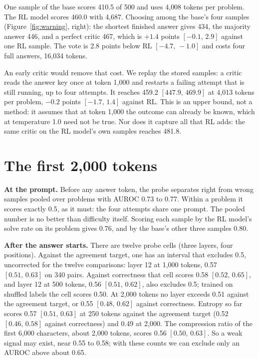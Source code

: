 \documentclass[10pt]{article}
\newcommand{\ci}[2]{$[#1,\,#2]$}
\begin{document}
One sample of the base scores 410.5 of 500 and uses 4{,}008 tokens per problem. The RL model scores 460.0 with
4{,}687. Choosing among the base's four samples (Figure~\ref{fig:warning}, right): the shortest finished answer
gives 434, the majority answer 446, and a perfect critic 467, which is $+1.4$ points \ci{-0.1}{2.9} against
one RL sample. The vote is 2.8 points below RL \ci{-4.7}{-1.0} and costs four full answers, 16{,}034 tokens.

An early critic would remove that cost. We replay the stored samples: a critic reads the answer key once at
token 1{,}000 and restarts a failing attempt that is still running, up to four attempts. It reaches 459.2
\ci{447.9}{469.9} at 4{,}013 tokens per problem, $-0.2$ points \ci{-1.7}{1.4} against RL. This is an upper
bound, not a method: it assumes that at token 1{,}000 the outcome can already be known, which at temperature
1.0 need not be true. Nor does it capture all that RL adds: the same critic on the RL model's own samples reaches 481.8.

\section{The first 2{,}000 tokens}

\textbf{At the prompt.} Before any answer token, the probe separates right from wrong samples pooled over problems
with AUROC 0.73 to 0.77. Within a problem it scores exactly 0.5, as it must: the four attempts share one prompt.
The pooled number is no better than difficulty itself. Scoring each sample by the RL model's solve rate on its
problem gives 0.76, and by the base's other three samples 0.80.

\textbf{After the answer starts.} There are twelve probe cells (three layers, four positions). Against the
agreement target, one has an interval that excludes 0.5, uncorrected for the twelve comparisons: layer 12 at
1{,}000 tokens, 0.57 \ci{0.51}{0.63} on 340 pairs. Against correctness that cell scores 0.58 \ci{0.52}{0.65},
and layer 12 at 500 tokens, 0.56 \ci{0.51}{0.62}, also excludes 0.5; trained on shuffled labels the cell scores
0.50. At 2{,}000 tokens no layer exceeds 0.51 against the agreement target, or 0.55 \ci{0.48}{0.62} against
correctness. Entropy so far scores 0.57 \ci{0.51}{0.63} at 250 tokens against the agreement target (0.52
\ci{0.46}{0.58} against correctness) and 0.49 at 2{,}000. The compression ratio of the first 6{,}000 characters,
about 2{,}000 tokens, scores 0.56 \ci{0.50}{0.63}. So a weak signal may exist, near 0.55 to 0.58; with these
counts we can exclude only an AUROC above about 0.65.
\end{document}
